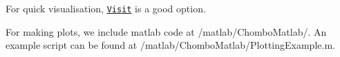 For quick visualisation, \href{https://wci.llnl.gov/simulation/computer-codes/visit/source}{\tt Visit} is a good option.

For making plots, we include matlab code at {\ttfamily /matlab/\+Chombo\+Matlab/}. An example script can be found at {\ttfamily /matlab/\+Chombo\+Matlab/\+Plotting\+Example.m}. 